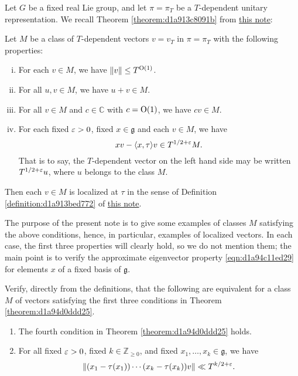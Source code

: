 \documentclass[reqno]{amsart} 
\numberwithin{equation}{section}
\begin{document}
Let $G$ be a fixed real Lie group, and let $\pi = \pi_T$ be a $T$-dependent unitary representation.  We recall Theorem \ref{theorem:d1a913c8091b} from \href{20230522T150333__microlocal-localized-vectors.pdf}{this note}:
\begin{theorem}\label{theorem:d1a94d0ddd25}
  Let $M$ be a class of $T$-dependent vectors $v = v_T$ in $\pi = \pi_T$ with the following properties:
  \begin{enumerate}[(i)]
  \item For each $v \in M$, we have $\lVert v \rVert \leq T^{\operatorname{O}(1)}$.
  \item For all $u, v \in M$, we have $u + v \in M$.
  \item For all $v \in M$ and $c \in \mathbb{C}$ with $c = \operatorname{O}(1)$, we have $c v \in M$.
  \item For each fixed $\varepsilon > 0$, fixed $x \in \mathfrak{g}$ and each $v \in M$, we have
    \begin{equation}\label{eqn:d1a94c11ed29}
      x v - \langle x, \tau  \rangle v \in T^{1/2+\varepsilon} M.
    \end{equation}
    That is to say, the $T$-dependent vector on the left hand side may be written $T^{1/2+\varepsilon} u$, where $u$ belongs to the class $M$.
  \end{enumerate}
  Then each $v \in M$ is localized at $\tau$ in the sense of Definition \ref{definition:d1a913bed772} of \href{20230522T150333__microlocal-localized-vectors.pdf}{this note}.
\end{theorem}

The purpose of the present note is to give some examples of classes $M$ satisfying the above conditions, hence, in particular, examples of localized vectors.  In each case, the first three properties will clearly hold, so we do not mention them; the main point is to verify the approximate eigenvector property \eqref{eqn:d1a94c11ed29} for elements $x$ of a fixed basis of $\mathfrak{g}$.


\begin{exercise}\label{exercise:d1aa39b6bf0d}
  Verify, directly from the definitions, that the following are equivalent for a class $M$ of vectors satisfying the first three conditions in Theorem \ref{theorem:d1a94d0ddd25}.
  \begin{enumerate}
\item The fourth condition in Theorem \ref{theorem:d1a94d0ddd25} holds.
\item For all fixed $\varepsilon > 0$, fixed $k \in \mathbb{Z}_{\geq 0}$, and fixed $x_1,\dotsc,x_k \in \mathfrak{g}$, we have
  \begin{equation*}
\lVert (x_1 - \tau(x_1)) \dotsb (x_k - \tau(x_k)) v \rVert \ll T^{k/2 + \varepsilon }.
\end{equation*}
\end{enumerate}
\end{exercise}
\end{document}
